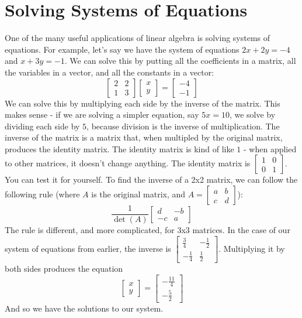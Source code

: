 \section{Solving Systems of Equations}
One of the many useful applications of linear algebra is solving systems of equations. For example, let's say we have the system of equations $2x+2y=-4$ and $x+3y=-1$. We can solve this by putting all the coefficients in a matrix, all the variables in a vector, and all the constants in a vector:
\begin{equation*}
\begin{bmatrix}2&2\\1&3\end{bmatrix}\begin{bmatrix}x\\y\end{bmatrix}=\begin{bmatrix}-4\\-1\end{bmatrix}
\end{equation*}
We can solve this by multiplying each side by the inverse of the matrix. This makes sense - if we are solving a simpler equation, say $5x=10$, we solve by dividing each side by $5$, because division is the inverse of multiplication. The inverse of the matrix is a matrix that, when multipled by the original matrix, produces the identity matrix. The identity matrix is kind of like $1$ - when applied to other matrices, it doesn't change anything. The identity matrix is $\begin{bmatrix}1&0\\0&1\end{bmatrix}$. You can test it for yourself. To find the inverse of a 2x2 matrix, we can follow the following rule (where $A$ is the original matrix, and $A = \begin{bmatrix}a&b\\c&d\end{bmatrix}$):
\begin{equation*}
\frac{1}{\det(A)}\begin{bmatrix}d&-b\\-c&a\end{bmatrix}
\end{equation*}
The rule is different, and more complicated, for 3x3 matrices. In the case of our system of equations from earlier, the inverse is $\begin{bmatrix}\frac{3}{4}&-\frac{1}{2}\\-\frac{1}{4}&\frac{1}{2}\end{bmatrix}$. Multiplying it by both sides produces the equation
\begin{equation*}
\begin{bmatrix}x\\y\end{bmatrix}=\begin{bmatrix}-\frac{11}{4}\\-\frac{5}{2}\end{bmatrix}
\end{equation*}
And so we have the solutions to our system.

